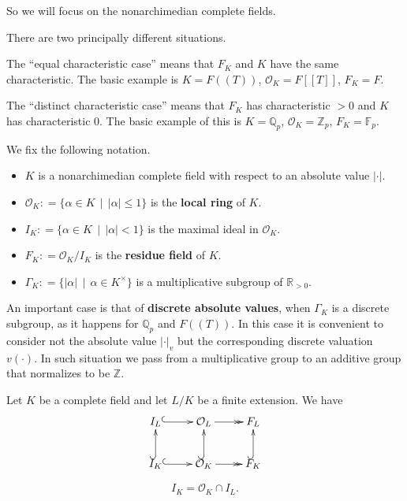 \documentclass{article}
\newcommand{\term}{\textbf}
\newcommand{\dfn}{\mathrel{\mathop:}=}
\newcommand{\ZZ}{\mathbb{Z}}
\newcommand{\FF}{\mathbb{F}}
\newcommand{\QQ}{\mathbb{Q}}
\newcommand{\examplesymbol}{$\blacktriangle$}
\renewcommand{\qedsymbol}{$\blacksquare$}
\theoremstyle{myplain}
\theoremstyle{mydefinition}
\newenvironment{example}
  {\pushQED{\qed}\renewcommand{\qedsymbol}{\examplesymbol}\examplex}
  {\popQED\endexamplex}
\begin{document}
So we will focus on the nonarchimedian complete fields.

\begin{example}
  There are two principally different situations.

  The ``equal characteristic case'' means that $F_K$ and $K$ have the same
  characteristic. The basic example is $K = F (\!(T)\!)$, $\mathcal{O}_K = F [\![T]\!]$,
  $F_K = F$.

  The ``distinct characteristic case'' means that $F_K$ has characteristic $> 0$
  and $K$ has characteristic $0$. The basic example of this is $K = \QQ_p$,
  $\mathcal{O}_K = \ZZ_p$, $F_K = \FF_p$.
\end{example}

We fix the following notation.

\begin{itemize}
\item $K$ is a nonarchimedian complete field with respect to an absolute value
  $|\cdot|$.

\item $\mathcal{O}_K \dfn \{ \alpha \in K \,\mid\, |\alpha| \le 1 \}$ is the
  \term{local ring} of $K$.

\item $I_K \dfn \{ \alpha \in K \,\mid\, |\alpha| < 1 \}$ is the maximal ideal
  in $\mathcal{O}_K$.

\item $F_K \dfn \mathcal{O}_K/I_K$ is the \term{residue field} of $K$.

\item $\Gamma_K \dfn \{ |\alpha| \,\mid\, \alpha \in K^\times \}$ is a
  multiplicative subgroup of $\mathbb{R}_{> 0}$.
\end{itemize}

An important case is that of \term{discrete absolute values}, when $\Gamma_K$ is
a discrete subgroup, as it happens for $\QQ_p$ and $F (\!(T)\!)$. In this case
it is convenient to consider not the absolute value $|\cdot|_v$ but the
corresponding discrete valuation $v (\cdot)$. In such situation we pass from a
multiplicative group to an additive group that normalizes to be $\ZZ$.

Let $K$ be a complete field and let $L/K$ be a finite extension. We have
\[ \xymatrix{
    I_L\ar@{^(->}[r] & \mathcal{O}_L\ar@{->>}[r] & F_L \\
    I_K\ar@{^(->}[r]\ar@{^(->}[u] & \mathcal{O}_K\ar@{->>}[r]\ar@{^(->}[u] & F_K\ar@{^(->}[u]
  } \]

\[ I_K = \mathcal{O}_K \cap I_L. \]
\end{document}
